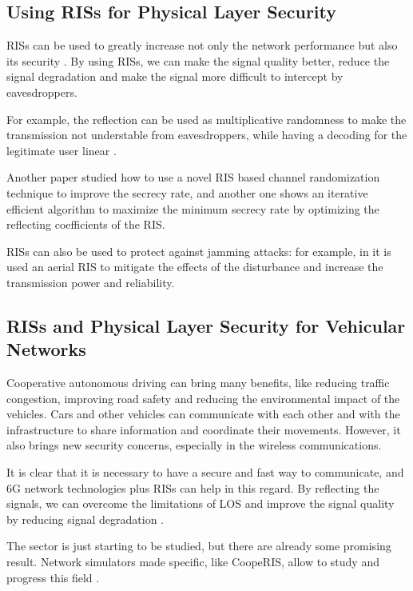 \subsection{Using RISs for Physical Layer Security}

RISs can be used to greatly increase not only the network performance but also its security \cite{10409564}. By using RISs, we can make the signal quality better, reduce the signal degradation and make the signal more difficult to intercept by eavesdroppers.

For example, the reflection can be used as multiplicative randomness to make the transmission not understable from eavesdroppers, while having a decoding for the legitimate user linear \cite{9328149}.

Another paper \cite{s21041439} studied how to use a novel RIS based channel randomization technique to improve the secrecy rate, and another one \cite{8742603} shows an iterative efficient algorithm to maximize the minimum secrecy rate by optimizing the reflecting coefficients of the RIS.

RISs can also be used to protect against jamming attacks: for example, in \cite{9424472} it is used an aerial RIS to mitigate the effects of the disturbance and increase the transmission power and reliability.

\subsection{RISs and Physical Layer Security for Vehicular Networks}

Cooperative autonomous driving can bring many benefits, like reducing traffic congestion, improving road safety and reducing the environmental impact of the vehicles. Cars and other vehicles can communicate with each other and with the infrastructure to share information and coordinate their movements. However, it also brings new security concerns, especially in the wireless communications.

It is clear that it is necessary to have a secure and fast way to communicate, and 6G network technologies plus RISs can help in this regard. By reflecting the signals, we can overcome the limitations of LOS and improve the signal quality by reducing signal degradation \cite{10715713}.

The sector is just starting to be studied, but there are already some promising result. Network simulators made specific, like CoopeRIS, allow to study and progress this field \cite{SEGATA2024110443}.

